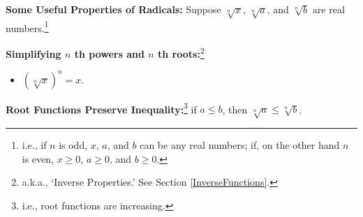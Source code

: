 \documentclass{ximera}
\begin{document}

\begin{theorem} \label{basicradicalpropseqineq}  \textbf{Some Useful Properties of Radicals:}  Suppose $\sqrt[n]{x}$, $\sqrt[n]{a}$, and $\sqrt[n]{b}$ are real numbers.\footnote{i.e., if $n$ is odd, $x$, $a$, and $b$ can be any real numbers;  if, on the other hand $n$ is even, $x \geq 0$, $a \geq 0$, and $b \geq 0$.}


\textbf{Simplifying $n$ th powers and $n$ th roots:}\footnote{a.k.a., `Inverse Properties.'  See Section \ref{InverseFunctions}.}

\begin{itemize}

\item  $\left( \sqrt[n]{x}\right)^n = x$.


\end{itemize}

\textbf{Root Functions Preserve Inequality:}\footnote{i.e., root functions are increasing.}  if $a \leq b$, then $\sqrt[n]{a} \leq \sqrt[n]{b}$.

\end{theorem}
\end{document}
